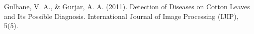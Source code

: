 \documentclass[conference]{IEEEtran}
\begin{document}
\begin{thebibliography}{00}












 Gulhane, V. A., \& Gurjar, A. A. (2011). Detection of Diseases on Cotton Leaves and Its Possible Diagnosis. International Journal of Image Processing (IJIP), 5(5).


\end{thebibliography}
\end{document}
